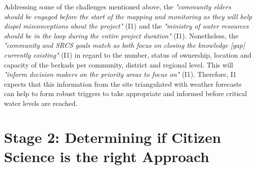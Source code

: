 Addressing some of the challenges mentioned above, the \textit{"community elders should be engaged before the start of the mapping and monitoring as they will help dispel misconceptions about the project"} (I1) and the \textit{"ministry of water resources should be in the loop during the entire project duration"} (I1). Nonetheless, the \textit{"community and SRCS goals match as both focus on closing the knowledge [gap] currently existing"} (I1) in regard to the number, status of ownership, location and capacity of the berkads per community, district and regional level. This will \textit{"inform decision makers on the priority areas to focus on"} (I1). Therefore, I1 expects that this information from the site triangulated with weather forecasts can help to form robust triggers to take appropriate and informed  before critical water levels are reached.


\section{Stage 2: Determining if Citizen Science is the right Approach}

